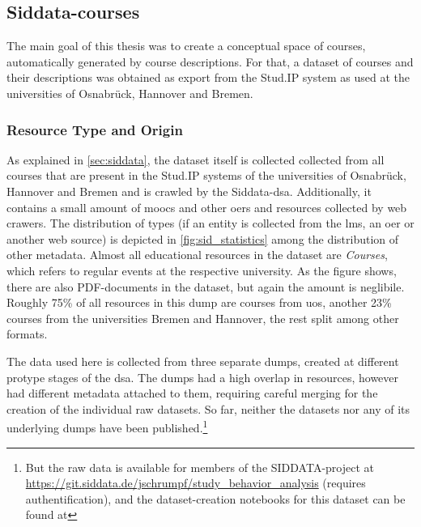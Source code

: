 \subsection{Siddata-courses}
\label{sec:dataset_siddata}


The main goal of this thesis was to create a conceptual space of courses, automatically generated by course descriptions. For that, a dataset of courses and their descriptions was obtained as export from the Stud.IP system as used at the universities of Osnabrück, Hannover and Bremen.

\subsubsection*{Resource Type and Origin}

As explained in \autoref{sec:siddata}, the dataset itself is collected collected from all courses that are present in the Stud.IP systems of the universities of Osnabrück, Hannover and Bremen and is crawled by the Siddata-\gls{dsa}. Additionally, it contains a small amount of \glspl{mooc} and other \glspl{oer} and resources collected by web crawers. The distribution of types (if an entity is collected from the \gls{lms}, an \gls{oer} or another web source) is depicted in \autoref{fig:sid_statistics} among the distribution of other metadata. Almost all educational resources in the dataset are \textit{Courses}, which refers to regular events at the respective university. As the figure shows, there are also PDF-documents in the dataset, but again the amount is neglibile. Roughly 75\% of all resources in this dump are courses from \gls{uos}, another 23\% courses from the universities Bremen and Hannover, the rest split among other formats. 

The data used here is collected from three separate dumps, created at different protype stages of the \gls{dsa}. The dumps had a high overlap in resources, however had different metadata attached to them, requiring careful merging for the creation of the individual raw datasets. So far, neither the datasets nor any of its underlying dumps have been published.\footnote{But the raw data is available for members of the SIDDATA-project at \url{https://git.siddata.de/jschrumpf/study_behavior_analysis} (requires authentification), and the dataset-creation notebooks for this dataset can be found at }


